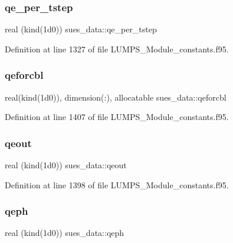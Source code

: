 \subsubsection{\texorpdfstring{qe\+\_\+per\+\_\+tstep}{qe\_per\_tstep}}
{\footnotesize\ttfamily real (kind(1d0)) sues\+\_\+data\+::qe\+\_\+per\+\_\+tstep}



Definition at line 1327 of file L\+U\+M\+P\+S\+\_\+\+Module\+\_\+constants.\+f95.

\mbox{\label{namespacesues__data_a08451f44609cb386788368a9136432c7}} 
\subsubsection{\texorpdfstring{qeforcbl}{qeforcbl}}
{\footnotesize\ttfamily real(kind(1d0)), dimension(\+:), allocatable sues\+\_\+data\+::qeforcbl}



Definition at line 1407 of file L\+U\+M\+P\+S\+\_\+\+Module\+\_\+constants.\+f95.

\mbox{\label{namespacesues__data_ae467db694bf0c56a1afbee403a0d8907}} 
\subsubsection{\texorpdfstring{qeout}{qeout}}
{\footnotesize\ttfamily real (kind(1d0)) sues\+\_\+data\+::qeout}



Definition at line 1398 of file L\+U\+M\+P\+S\+\_\+\+Module\+\_\+constants.\+f95.

\mbox{\label{namespacesues__data_a9dfa646ad79f2eadc90c544d5ad4462c}} 
\subsubsection{\texorpdfstring{qeph}{qeph}}
{\footnotesize\ttfamily real (kind(1d0)) sues\+\_\+data\+::qeph}



